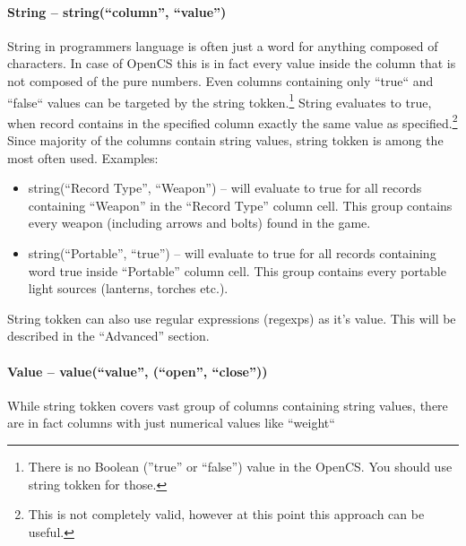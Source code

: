 \paragraph{String -- string(``column'', ``value'')}
String in programmers language is often just a word for anything composed of characters. In case of OpenCS this is in fact every value inside the column that is not composed of the pure numbers. Even columns containing only ``true`` and ``false`` values can be targeted by the string tokken.\footnote{There is no Boolean (''true'' or ``false'') value in the OpenCS. You should use string tokken for those.} String evaluates to true, when record contains in the specified column exactly the same value as specified.\footnote{This is not completely valid, however at this point this approach can be useful.}
\linebreak
Since majority of the columns contain string values, string tokken is among the most often used. Examples:
\begin{itemize}
 \item string(``Record Type'', ``Weapon'') -- will evaluate to true for all records containing ``Weapon'' in the ``Record Type'' column cell. This group contains every weapon (including arrows and bolts) found in the game.
 \item string(``Portable'', ``true'') -- will evaluate to true for all records containing word true inside ``Portable'' column cell. This group contains every portable light sources (lanterns, torches etc.).
\end{itemize}
String tokken can also use regular expressions (regexps) as it's value. This will be described in the ``Advanced'' section.

\paragraph{Value -- value(``value'', (``open'', ``close''))}
While string tokken covers vast group of columns containing string values, there are in fact columns with just numerical values like ``weight``